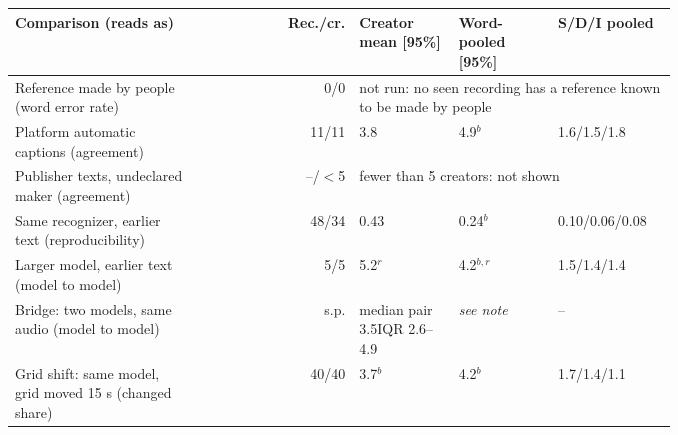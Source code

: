 {\scriptsize\setlength{\tabcolsep}{2.5pt}
\begin{tabular}{@{}p{0.29\linewidth}rp{0.15\linewidth}p{0.15\linewidth}p{0.18\linewidth}@{}}
\toprule
Comparison (reads as) & Rec./cr. & Creator mean [95\%] & Word-pooled [95\%] & S/D/I pooled \\
\midrule
Reference made by people (word error rate) & 0/0 & \multicolumn{3}{p{0.48\columnwidth}}{not run: no seen recording has a reference known to be made by people} \\
Platform automatic captions (agreement) & 11/11 & 3.8\newline[2.2, 5.3] & 4.9\newline[2.6, 7.2]$^{b}$ & 1.6/1.5/1.8 \\
Publisher texts, undeclared maker (agreement) & --/$<$5 & \multicolumn{3}{p{0.48\columnwidth}}{fewer than 5 creators: not shown} \\
Same recognizer, earlier text (reproducibility) & 48/34 & 0.43\newline[0.07, 0.78] & 0.24\newline[0.03, 0.58]$^{b}$ & 0.10/0.06/0.08 \\
Larger model, earlier text (model to model) & 5/5 & 5.2\newline[0.7, 9.7]$^{r}$ & 4.2\newline[3.0, 7.7]$^{b,r}$ & 1.5/1.4/1.4 \\
Bridge: two models, same audio (model to model) & s.p. & median pair 3.5\newline IQR 2.6--4.9 & \emph{see note} & -- \\
Grid shift: same model, grid moved 15 s (changed share) & 40/40 & 3.7\newline[2.9, 4.9]$^{b}$ & 4.2\newline[3.1, 5.4]$^{b}$ & 1.7/1.4/1.1 \\
\bottomrule
\end{tabular}}
